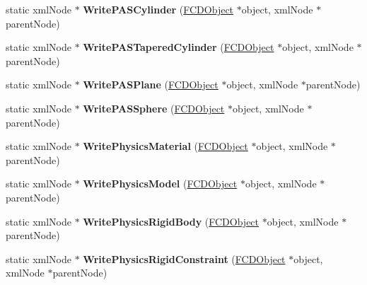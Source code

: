 \begin{DoxyCompactItemize}
\item 
\hypertarget{classFArchiveXML_a945d6e1751c201a5eeab8d7e6ba0b2f8}{
static xmlNode $\ast$ {\bfseries WritePASCylinder} (\hyperlink{classFCDObject}{FCDObject} $\ast$object, xmlNode $\ast$parentNode)}
\label{classFArchiveXML_a945d6e1751c201a5eeab8d7e6ba0b2f8}

\item 
\hypertarget{classFArchiveXML_abb256df79c4f773714a3aa4f78dcf4d5}{
static xmlNode $\ast$ {\bfseries WritePASTaperedCylinder} (\hyperlink{classFCDObject}{FCDObject} $\ast$object, xmlNode $\ast$parentNode)}
\label{classFArchiveXML_abb256df79c4f773714a3aa4f78dcf4d5}

\item 
\hypertarget{classFArchiveXML_a0b92ff45f03e4cb17b25037053474ecb}{
static xmlNode $\ast$ {\bfseries WritePASPlane} (\hyperlink{classFCDObject}{FCDObject} $\ast$object, xmlNode $\ast$parentNode)}
\label{classFArchiveXML_a0b92ff45f03e4cb17b25037053474ecb}

\item 
\hypertarget{classFArchiveXML_a9715507d6f1e6c8b163d21fcd26ec83a}{
static xmlNode $\ast$ {\bfseries WritePASSphere} (\hyperlink{classFCDObject}{FCDObject} $\ast$object, xmlNode $\ast$parentNode)}
\label{classFArchiveXML_a9715507d6f1e6c8b163d21fcd26ec83a}

\item 
\hypertarget{classFArchiveXML_aa187f91bf2d3a6a802454705bb4889aa}{
static xmlNode $\ast$ {\bfseries WritePhysicsMaterial} (\hyperlink{classFCDObject}{FCDObject} $\ast$object, xmlNode $\ast$parentNode)}
\label{classFArchiveXML_aa187f91bf2d3a6a802454705bb4889aa}

\item 
\hypertarget{classFArchiveXML_a490b0ec6047d14ad96653d57c978b133}{
static xmlNode $\ast$ {\bfseries WritePhysicsModel} (\hyperlink{classFCDObject}{FCDObject} $\ast$object, xmlNode $\ast$parentNode)}
\label{classFArchiveXML_a490b0ec6047d14ad96653d57c978b133}

\item 
\hypertarget{classFArchiveXML_a90eabd54daf9908c9c92740c244af39b}{
static xmlNode $\ast$ {\bfseries WritePhysicsRigidBody} (\hyperlink{classFCDObject}{FCDObject} $\ast$object, xmlNode $\ast$parentNode)}
\label{classFArchiveXML_a90eabd54daf9908c9c92740c244af39b}

\item 
\hypertarget{classFArchiveXML_afff2889527c35146cc597cb94b403270}{
static xmlNode $\ast$ {\bfseries WritePhysicsRigidConstraint} (\hyperlink{classFCDObject}{FCDObject} $\ast$object, xmlNode $\ast$parentNode)}
\label{classFArchiveXML_afff2889527c35146cc597cb94b403270}


\end{DoxyCompactItemize}
